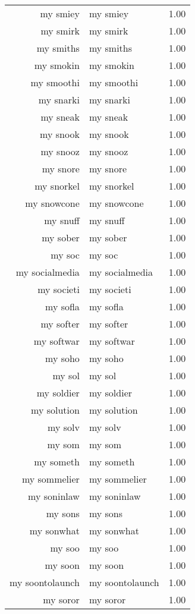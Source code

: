 \begin{table}[ht]
\begin{tabular}{rlr}
  my smiey & my smiey & 1.00 \\ 
  my smirk & my smirk & 1.00 \\ 
  my smiths & my smiths & 1.00 \\ 
  my smokin & my smokin & 1.00 \\ 
  my smoothi & my smoothi & 1.00 \\ 
  my snarki & my snarki & 1.00 \\ 
  my sneak & my sneak & 1.00 \\ 
  my snook & my snook & 1.00 \\ 
  my snooz & my snooz & 1.00 \\ 
  my snore & my snore & 1.00 \\ 
  my snorkel & my snorkel & 1.00 \\ 
  my snowcone & my snowcone & 1.00 \\ 
  my snuff & my snuff & 1.00 \\ 
  my sober & my sober & 1.00 \\ 
  my soc & my soc & 1.00 \\ 
  my socialmedia & my socialmedia & 1.00 \\ 
  my societi & my societi & 1.00 \\ 
  my sofla & my sofla & 1.00 \\ 
  my softer & my softer & 1.00 \\ 
  my softwar & my softwar & 1.00 \\ 
  my soho & my soho & 1.00 \\ 
  my sol & my sol & 1.00 \\ 
  my soldier & my soldier & 1.00 \\ 
  my solution & my solution & 1.00 \\ 
  my solv & my solv & 1.00 \\ 
  my som & my som & 1.00 \\ 
  my someth & my someth & 1.00 \\ 
  my sommelier & my sommelier & 1.00 \\ 
  my soninlaw & my soninlaw & 1.00 \\ 
  my sons & my sons & 1.00 \\ 
  my sonwhat & my sonwhat & 1.00 \\ 
  my soo & my soo & 1.00 \\ 
  my soon & my soon & 1.00 \\ 
  my soontolaunch & my soontolaunch & 1.00 \\ 
  my soror & my soror & 1.00 \\ 

\end{tabular}
\end{table}
